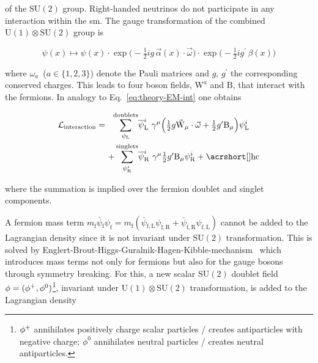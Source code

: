 of the $\mathrm{SU(2)}$ group. Right-handed neutrinos do not participate in any interaction within the \gls{sm}. The gauge transformation of the combined $\mathrm{U(1)}\otimes \mathrm{SU(2)}$ group is

\begin{equation}
\psi(x)\mapsto\psi(x)\cdot\exp\Big(-\tfrac{1}{2}ig\,\vec{\alpha}(x)\cdot\vec{\omega}\Big)\cdot\exp\Big(-\tfrac{1}{2}ig^{\prime}\,\beta(x)\Big) \label{eq:theory-u1su2-transformation}
\end{equation}

where $\omega_{a}$~($a\in\{1,2,3\}$) denote the Pauli matrices and $g$, $g^{\prime}$ the corresponding conserved charges. This leads to four boson fields, $\mathrm{W}^{a}$ and $\mathrm{B}$, that interact with the fermions. In analogy to Eq.~\ref{eq:theory-EM-int} one obtains

\begin{align}
\mathcal{L}_\mathrm{interaction}=~~\sum_{\psi_\mathrm{L}}^\mathrm{doublets}&\bar{\psi}^{i}_\mathrm{L}~\gamma^{\mu}\Big(\tfrac{1}{2}g\vec{\mathrm{W}}_{\mu}\cdot\vec{\omega}+\tfrac{1}{2}g^{\prime}\mathrm{B}_{\mu}\Big)\psi^{i}_\mathrm{L} \nonumber\\
+\sum_{\psi^{i}_\mathrm{R}}^\mathrm{singlets}&\bar{\psi}^{i}_\mathrm{R}~\gamma^{\mu}\tfrac{1}{2}g^{\prime}\mathrm{B}_{\mu}\psi^{i}_\mathrm{R} + \mathrm{\gls{hc}} \label{eq:theory-codev-su2-interaction}
\end{align}

where the summation is implied over the fermion doublet and singlet components.

A fermion mass term $ m_\mathrm{f}\bar{\psi}{}_\mathrm{f}\psi_\mathrm{f}=m_\mathrm{f}(\bar{\psi}{}_\mathrm{f,L}\psi_\mathrm{f,R}+\bar{\psi}_\mathrm{f,R}\psi_\mathrm{f,L})$ cannot be added to the Lagrangian density since it is not invariant under $\mathrm{SU(2)}$ transformation. This is solved by Englert-Brout-Higgs-Guralnik-Hagen-Kibble-mechanism~\cite{HIGGS1964132,PhysRevLett.13.508,PhysRevLett.13.321,PhysRevLett.13.585} which introduces mass terms not only for fermions but also for the gauge bosons through symmetry breaking. For this, a new scalar $\mathrm{SU(2)}$ doublet field $\phi=(\phi^{+},\phi^{0})$\footnote{$\phi^{+}$ annihilates positively charge scalar particles / creates antiparticles with negative charge; $\phi^{0}$ annihilates neutral particles / creates neutral antiparticles.}, invariant under $\mathrm{U(1)}\otimes\mathrm{SU(2)}$ transformation, is added to the Lagrangian density

